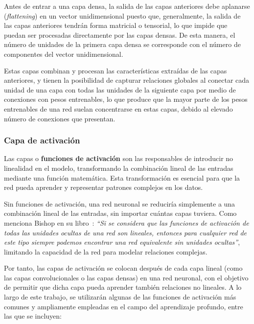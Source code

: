 Antes de entrar a una capa densa, la salida de las capas anteriores debe aplanarse (\emph{flattening}) en un vector unidimensional puesto que, generalmente, la salida de las capas anteriores tendrán forma matricial o tensorial, lo que impide que puedan ser procesadas directamente por las capas densas. De esta manera, el número de unidades de la primera capa densa se corresponde con el número de componentes del vector unidimensional.

Estas capas combinan y procesan las características extraídas de las capas anteriores, y tienen la posibilidad de capturar relaciones globales al conectar cada unidad de una capa con todas las unidades de la siguiente capa por medio de conexiones con pesos entrenables, lo que produce que la mayor parte de los pesos entrenables de una red suelan concentrarse en estas capas, debido al elevado número de conexiones que presentan.

\subsubsection{Capa de activación}\label{subsubsec:capa-de-activacion}

Las capas o \textbf{funciones de activación} son las responsables de introducir no linealidad en el modelo, transformando la combinación lineal de las entradas mediante una función matemática. Esta transformación es esencial para que la red pueda aprender y representar patrones complejos en los datos. 

Sin funciones de activación, una red neuronal se reduciría simplemente a una combinación lineal de las entradas, sin importar cuántas capas tuviera. Como menciona Bishop en su libro~\cite{Bishop2006}: \textit{``Si se considera que las funciones de activación de todas las unidades ocultas de una red son lineales, entonces para cualquier red de este tipo siempre podemos encontrar una red equivalente sin unidades ocultas''}, limitando la capacidad de la red para modelar relaciones complejas.

Por tanto, las capas de activación se colocan después de cada capa lineal (como las capas convolucionales o las capas densas) en una red neuronal, con el objetivo de permitir que dicha capa pueda aprender también relaciones no lineales. A lo largo de este trabajo, se utilizarán algunas de las funciones de activación más comunes y ampliamente empleadas en el campo del aprendizaje profundo, entre las que se incluyen:

